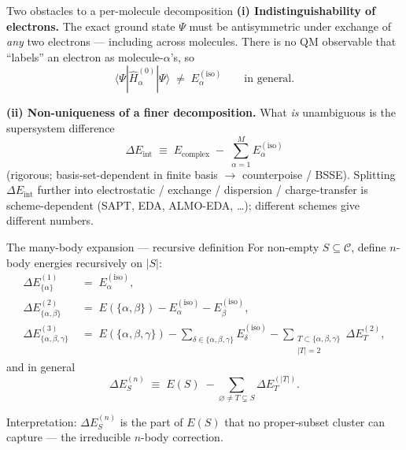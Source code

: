 \documentclass[aspectratio=169,11pt]{beamer}
\newcommand{\Hop}{\hat{H}}
\newcommand{\Eint}{\Delta E_{\mathrm{int}}}
\newcommand{\Eiso}{E^{(\mathrm{iso})}}
\newcommand{\Ecpl}{E_{\mathrm{complex}}}
\begin{document}
\begin{frame}{Two obstacles to a per-molecule decomposition}
\small
\textbf{(i) Indistinguishability of electrons.}\;
The exact ground state $\Psi$ must be antisymmetric under exchange of
\emph{any} two electrons --- including across molecules. There is no
QM observable that ``labels'' an electron as molecule-$\alpha$'s, so
\[
\langle\Psi|\Hop_\alpha^{(0)}|\Psi\rangle \;\neq\; \Eiso_\alpha
\qquad \text{in general.}
\]

\medskip
\textbf{(ii) Non-uniqueness of a finer decomposition.}\;
What \emph{is} unambiguous is the supersystem difference
\[
\boxed{\;\Eint \;\equiv\; \Ecpl \;-\; \sum_{\alpha=1}^{M}\Eiso_\alpha\;}
\]
(rigorous; basis-set-dependent in finite basis $\to$ counterpoise / BSSE).
Splitting $\Eint$ further into electrostatic / exchange / dispersion /
charge-transfer is scheme-dependent (SAPT, EDA, ALMO-EDA, \dots);
different schemes give different numbers.
\end{frame}

\begin{frame}{The many-body expansion --- recursive definition}
For non-empty $S\subseteq\mathcal{C}$, define $n$-body energies
recursively on $|S|$:
\begin{align*}
\Delta E^{(1)}_{\{\alpha\}}            \;&=\; \Eiso_\alpha,\\[1pt]
\Delta E^{(2)}_{\{\alpha,\beta\}}      \;&=\; E(\{\alpha,\beta\})-\Eiso_\alpha-\Eiso_\beta,\\[1pt]
\Delta E^{(3)}_{\{\alpha,\beta,\gamma\}}\;&=\; E(\{\alpha,\beta,\gamma\})
   -\!\!\!\sum_{\delta\in\{\alpha,\beta,\gamma\}}\!\!\Eiso_\delta
   -\!\!\!\!\sum_{\substack{T\subset\{\alpha,\beta,\gamma\}\\|T|=2}}\!\!\!\!\Delta E^{(2)}_T,
\end{align*}
and in general
\[
\boxed{\;
\Delta E^{(n)}_{S}
\;\equiv\; E(S)\;-\!\!\sum_{\varnothing\ne T\subsetneq S}\!\!\Delta E^{(|T|)}_{T}.\;}
\]

\smallskip
Interpretation: $\Delta E^{(n)}_S$ is the part of $E(S)$ that no
proper-subset cluster can capture --- the irreducible $n$-body
correction.
\end{frame}
\end{document}
